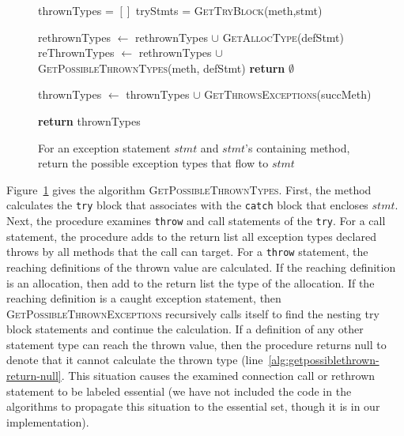 \begin{figure}[t]
\begin{algorithmic}[1]
\scriptsize
{}
\State thrownTypes = $[]$
\State tryStmts = \textsc{GetTryBlock}(meth,stmt)



\State rethrownTypes $\gets$ rethrownTypes $\cup$ 
\State \hspace{1cm} \textsc{GetAllocType}(defStmt)
\State reThrownTypes $\gets$ rethrownTypes $\cup$
\State \hspace{1cm} \textsc{GetPossibleThrownTypes}(meth, defStmt)
\Else 
\State \textbf{return} $\emptyset$
\label{alg:getpossiblethrown-return-null}
\EndIf
\EndFor


\State thrownTypes $\gets$ thrownTypes $\cup$ 
\State \hspace{1cm}\textsc{GetThrowsExceptions}(succMeth)
\EndFor

\EndIf

\EndFor

\State \textbf{return} thrownTypes

\EndProcedure
\end{algorithmic}
\caption{For an exception statement $stmt$ and $stmt$'s containing
  method, return the possible exception types that flow to
  $stmt$}\label{alg:GetPossibleThrownTypes}
\end{figure}

Figure~\ref{alg:GetPossibleThrownTypes} gives the algorithm
\textsc{GetPossibleThrownTypes}. First, the method calculates the
\lstinline!try! block that associates with the \lstinline!catch! block
that encloses $stmt$. Next, the procedure examines \lstinline!throw!
and call statements of the \lstinline!try!.  For a call statement, the
procedure adds to the return list all exception types declared throws
by all methods that the call can target.  For a \lstinline!throw!
statement, the reaching definitions of the thrown value are
calculated.  If the reaching definition is an allocation, then add to
the return list the type of the allocation.  If the reaching
definition is a caught exception statement, then
\textsc{GetPossibleThrownExceptions} recursively calls itself to find
the nesting try block statements and continue the calculation.  If a
definition of any other statement type can reach the thrown value,
then the procedure returns null to denote that it cannot calculate the
thrown type (line~\ref{alg:getpossiblethrown-return-null}.  This
situation causes the examined connection call or rethrown statement to
be labeled essential (we have not included the code in the algorithms
to propagate this situation to the essential set, though it is in our
implementation).


